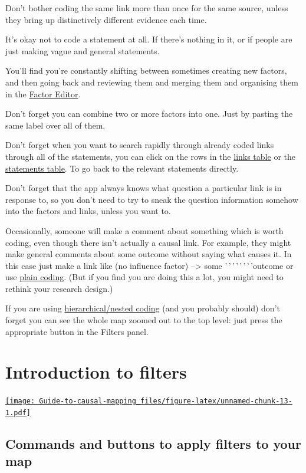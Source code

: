 \documentclass[
]{book}
\begin{document}
Don't bother coding the same link more than once for the same source, unless they bring up distinctively different evidence each time.

It's okay not to code a statement at all. If there's nothing in it, or if people are just making vague and general statements.

You'll find you're constantly shifting between sometimes creating new factors, and then going back and reviewing them and merging them and organising them in the \protect\hyperlink{factor-editor}{Factor Editor}.

Don't forget you can combine two or more factors into one. Just by pasting the same label over all of them.

Don't forget when you want to search rapidly through already coded links through all of the statements, you can click on the rows in the \protect\hyperlink{the-links-table}{links table} or the \protect\hyperlink{the-statements-table}{statements table}. To go back to the relevant statements directly.

Don't forget that the app always knows what question a particular link is in response to, so you don't need to try to sneak the question information somehow into the factors and links, unless you want to.

Occasionally, someone will make a comment about something which is worth coding, even though there isn't actually a causal link. For example, they might make general comments about some outcome without saying what causes it. In this case just make a link like (no influence factor) --\textgreater{} some '\,'\,'\,'\,'\,'\,'\,'outcome or use \protect\hyperlink{xplain_coding}{plain coding}. (But if you find you are doing this a lot, you might need to rethink your research design.)

If you are using \protect\hyperlink{xhierarchical-coding}{hierarchical/nested coding} (and you probably should) don't forget you can see the whole map zoomed out to the top level: just press the appropriate button in the Filters panel.

\hypertarget{xintro-filters}{%
\chapter{Introduction to filters}\label{xintro-filters}}

\href{https://player.vimeo.com/video/618270513}{\texttt{[image: Guide-to-causal-mapping\_files/figure-latex/unnamed-chunk-13-1.pdf]}}

\hypertarget{commands-and-buttons-to-apply-filters-to-your-map-1}{%
\section{Commands and buttons to apply filters to your map}\label{commands-and-buttons-to-apply-filters-to-your-map-1}}
\end{document}
